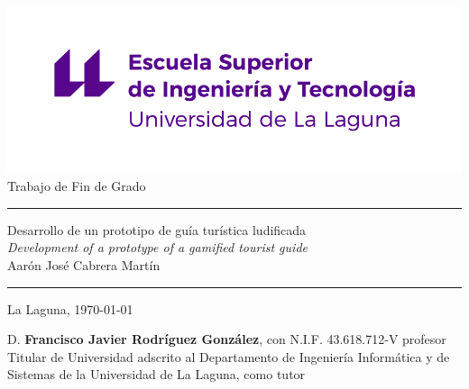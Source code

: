 \documentclass[spanish,a4paper,12pt,oneside]{extreport}
\begin{document}
\renewcommand\listtablename{Índice de Tablas}    
\renewcommand\listfigurename{Índice de Figuras}    

\pagestyle{empty}
\thispagestyle{empty}


\newcommand{\HRule}{\rule{\linewidth}{1mm}}
\setlength{\parindent}{0mm}
\setlength{\parskip}{0mm}


\begin{center}
\includegraphics[scale=0.8]{images/escuela-ingenieria-tecnologia-original}\\[10mm]
{\Huge Trabajo de Fin de Grado}
\end{center}

\HRule
\begin{flushright}
        {\Huge Desarrollo de un prototipo de guía turística ludificada} \\[2.5mm]
        {\Large \textit{Development of a prototype of a gamified tourist guide}} \\[5mm]
        {\Large Aarón José Cabrera Martín} \\[5mm]


\end{flushright}
\HRule
{}
\begin{center}
  \Large La Laguna, \today
\end{center}

\setlength{\parindent}{5mm}

\newpage
\thispagestyle{empty}

D. {\bf Francisco Javier Rodríguez González}, con N.I.F. 43.618.712-V profesor Titular de Universidad adscrito al Departamento de Ingeniería Informática y de Sistemas de la Universidad de La Laguna, como tutor
\end{document}

